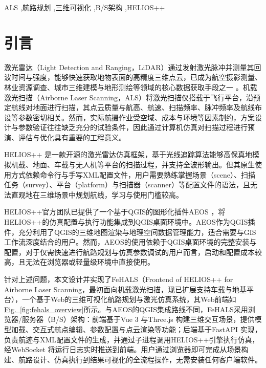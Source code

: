 \documentclass[a4paper,fleqn]{cas-sc}
\newcommand{\refFig}[1]{\hyperref[#1]{Fig.~\ref*{#1}}}
\begin{document}
\begin{keywords}
    ALS \sep 航路规划 \sep 三维可视化 \sep B/S架构 \sep HELIOS++
\end{keywords}

\MakeNJFUTitlePage[UseDocTitle]
\maketitle
\tableofcontents
\hrulefill

\section{引言}
激光雷达（Light Detection and Ranging，LiDAR）通过发射激光脉冲并测量其回波时间与强度，能够快速获取地物表面的高精度三维点云，已成为航空摄影测量、林业资源调查、城市三维建模与地形测绘等领域的核心数据获取手段之一 \citep{laserRemoteSensing}。机载激光扫描（Airborne Laser Scanning，ALS）将激光扫描仪搭载于飞行平台，沿预定航线对地面进行扫描，其点云质量与航高、航速、扫描频率、脉冲频率及航线布设等参数密切相关。然而，实际航摄作业受空域、成本与环境等因素制约，方案设计与参数验证往往缺乏充分的试验条件，因此通过计算机仿真对扫描过程进行预演、评估与优化具有重要的工程意义。

HELIOS++ \citep{heliosPlusPlus} 是一款开源的激光雷达仿真框架，基于光线追踪算法能够高保真地模拟机载、地面、车载与无人机等平台的扫描过程，并支持全波形输出。但其原生使用方式依赖命令行与手写XML配置文件，用户需要熟练掌握场景（scene）、扫描任务（survey）、平台（platform）与扫描器（scanner）等配置文件的语法，且无法直观地在三维场景中规划航线，学习与使用门槛较高。

HELIOS++官方团队已提供了一个基于QGIS的图形化插件AEOS \citep{aeos}，将HELIOS++的仿真配置与执行功能集成到QGIS桌面环境中。AEOS作为QGIS插件，充分利用了QGIS的三维地图渲染与地理空间数据管理能力，适合需要与GIS工作流深度结合的用户。然而，AEOS的使用依赖于QGIS桌面环境的完整安装与配置，对于仅需快速进行航路规划与仿真参数调试的用户而言，启动和配置成本较高，且无法在浏览器或轻量级环境中直接使用。

针对上述问题，本文设计并实现了FeHALS（Frontend of HELIOS++ for Airborne Laser Scanning，最初面向机载激光扫描，现已扩展支持车载与地基平台），一个基于Web的三维可视化航路规划与激光仿真系统，其Web前端如\refFig{fig:fehals_overview}所示。与AEOS的QGIS集成路线不同，FeHALS采用浏览器/服务器（B/S）架构：前端基于Vue 3 \citep{vuejs} 与Three.js \citep{threejs} 构建三维交互场景，提供模型加载、交互式航点编辑、参数配置与点云渲染等功能；后端基于FastAPI \citep{fastapi} 实现，负责航迹与XML配置文件的生成，并通过子进程调用HELIOS++引擎执行仿真，经WebSocket \citep{WebSocket} 将运行日志实时推送到前端。用户通过浏览器即可完成从场景构建、航路设计、仿真执行到结果可视化的全流程操作，无需安装任何客户端软件。
\end{document}

